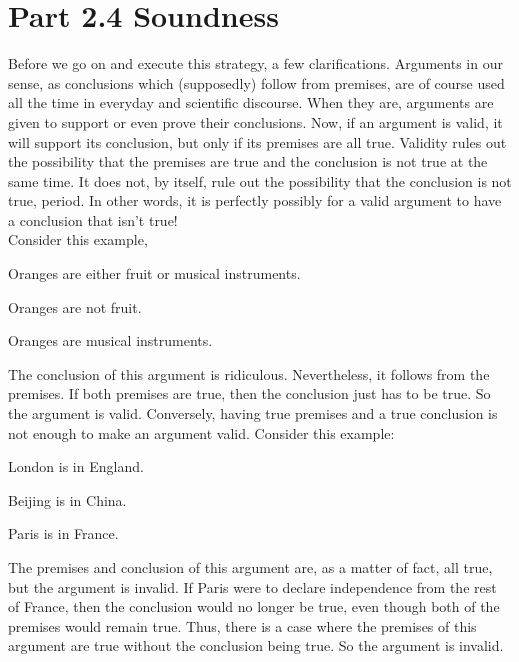 \section{Part 2.4 Soundness}
Before we go on and execute this strategy, a few clarifications. Arguments in our sense, as conclusions which (supposedly) follow from premises, are of course used all the time in everyday and scientific discourse. When they are, arguments are given to support or even prove their conclusions. Now, if an argument is valid, it will support its conclusion, but only if its premises are all true. Validity rules out the possibility that the premises are true and the conclusion is not true at the same time. It does not, by itself, rule out the possibility that the conclusion is not true, period. In other words, it is perfectly possibly for a valid argument to have a conclusion that isn’t true!\\
Consider this example,
\begin{earg}
\item[]Oranges are either fruit or musical instruments.
\item[]Oranges are not fruit.
\item[\therefore] Oranges are musical instruments.
\end{earg}
The conclusion of this argument is ridiculous. Nevertheless, it follows from the premises. If both premises are true, then the conclusion just has to be true. So the argument is valid.
Conversely, having true premises and a true conclusion is not enough to make an argument valid. Consider this example:
\begin{earg}
\item[]London is in England.
\item[]Beijing is in China.
\item[\therefore] Paris is in France.
\end{earg}
The premises and conclusion of this argument are, as a matter of fact, all true, but the argument is invalid. If Paris were to declare independence from the rest of France, then the conclusion would no longer be true, even though both of the premises would remain true. Thus, there is a case where the premises of this argument are true without the conclusion being true. So the argument is invalid.

